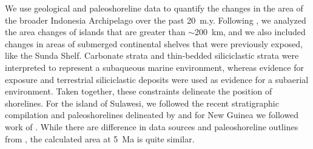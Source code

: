 \documentclass[11pt,letterpaper]{article}
\newcommand{\pCOtwo}{\textit{p}CO$_{2}$\xspace}
\begin{document}




We use geological and paleoshoreline data to quantify the changes in the area of the broader Indonesia Archipelago over the past 20~m.y. Following \citet{Molnar2015a}, we analyzed the area changes of islands that are greater than $\sim$200~km, and we also included changes in areas of submerged continental shelves that were previously exposed, like the Sunda Shelf. Carbonate strata and thin-bedded siliciclastic strata were interpreted to represent a subaqueous marine environment, whereas evidence for exposure and terrestrial siliciclastic deposits were used as evidence for a subaerial environment. Taken together, these constraints delineate the position of shorelines. For the island of Sulawesi, we followed the recent stratigraphic compilation and paleoshorelines delineated by \citet{Nugraha2018a} and for New Guinea we followed work of \citet{Norvick2003a, Cloos2005a, Gold2017a}. While there are difference in data sources and paleoshoreline outlines from \cite{Molnar2015a}, the calculated area at 5~Ma is quite similar.
\end{document}
